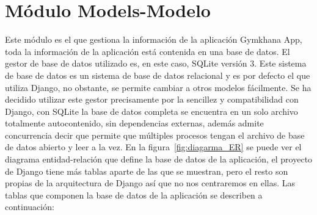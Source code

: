 \documentclass[a4paper, 12pt]{book}
\begin{document}
\section{Módulo Models-Modelo}
Este módulo es el que gestiona la información de la aplicación Gymkhana App, toda la información de la aplicación está contenida en una base de datos. El gestor de base de datos utilizado es, en este caso, SQLite versión 3. Este sistema de base de datos es un sistema de base de datos relacional y es por defecto el que utiliza Django, no obstante, se permite cambiar a otros modelos fácilmente. Se ha decidido utilizar este gestor precisamente por la sencillez y compatibilidad con Django, con SQLite la base de datos completa se encuentra en un solo archivo totalmente autocontenido, sin dependencias externas, además admite concurrencia decir que permite que múltiples procesos tengan el archivo de base de datos abierto y leer a la vez. En la figura~\ref{fig:diagarma_ER} se puede ver el diagrama entidad-relación que define la base de datos de la aplicación, el proyecto de Django tiene más tablas aparte de las que se muestran, pero el resto son propias de la arquitectura de Django así que no nos centraremos en ellas. Las tablas que componen la base de datos de la aplicación se describen a continuación:
\end{document}
